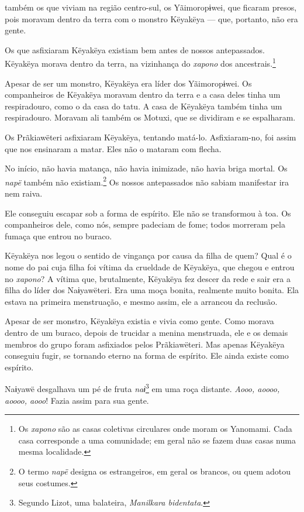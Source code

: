  também os que viviam na região centro-sul, os
Yãimoropɨwei, que ficaram presos, pois moravam dentro da terra com o
monstro Këyakëya --- que, portanto, não era gente. 

Os que asfixiaram Këyakëya existiam bem antes de nossos antepassados.
Këyakëya morava dentro da terra, na vizinhança do \textit{xapono} dos
ancestrais.\footnote{Os \textit{xapono} são as casas coletivas circulares onde moram os Yanomami. Cada casa corresponde a uma comunidade; em geral não se fazem duas casas numa mesma localidade.} 

Apesar de ser um monstro, Këyakëya era líder dos Yãimoropɨwei. Os
companheiros de Këyakëya moravam dentro da terra e a casa deles tinha um
respiradouro, como o da casa do tatu. A casa de Këyakëya também tinha um
respiradouro. Moravam ali também os Motuxi, que se dividiram e se
espalharam. 

Os Prãkiawëteri asfixiaram Këyakëya, tentando matá-lo. Asfixiaram-no,
foi assim que nos ensinaram a matar. Eles não o mataram com flecha. 

No início, não havia matança, não havia inimizade, não havia briga
mortal. Os \textit{napë} também não existiam.\footnote{O termo \textit{napë} designa os estrangeiros, em geral os brancos, ou quem adotou seus costumes.} Os nossos antepassados não sabiam manifestar ira nem raiva. 

Ele conseguiu escapar sob a forma de espírito. Ele não se transformou à
toa. Os companheiros dele, como nós, sempre padeciam de fome; todos
morreram pela fumaça que entrou no buraco. 

Këyakëya nos legou o sentido de vingança por causa da filha de quem?
Qual é o nome do pai cuja filha foi vítima da crueldade de Këyakëya, que
chegou e entrou no \textit{xapono}? A vítima que, brutalmente, Këyakëya fez
descer da rede e sair era a filha do líder dos Naɨyawëteri. Era uma moça
bonita, realmente muito bonita. Ela estava na primeira menstruação, e
mesmo assim, ele a arrancou da reclusão.

Apesar de ser monstro, Këyakëya existia e vivia como gente. Como
morava dentro de um buraco, depois de trucidar a menina menstruada, ele
e os demais membros do grupo foram asfixiados pelos Prãkiawëteri. Mas
apenas Këyakëya conseguiu fugir, se tornando eterno na forma de
espírito. Ele ainda existe como espírito. 

Naɨyawë desgalhava um pé de fruta \textit{naɨ}\footnote{ Segundo Lizot, uma balateira, \textit{Manilkara bidentata}.} em uma roça
distante. \textit{Aooo, aoooo, aoooo, aooo}! Fazia assim para sua gente. 

